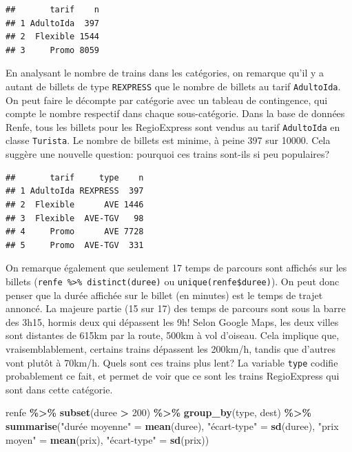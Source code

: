 \documentclass[
  11pt,
  letterpaper,
]{book}
\newenvironment{Shaded}{\begin{snugshade}}{\end{snugshade}}
\newcommand{\DecValTok}[1]{\textcolor[rgb]{0.00,0.00,0.81}{#1}}
\newcommand{\KeywordTok}[1]{\textcolor[rgb]{0.13,0.29,0.53}{\textbf{#1}}}
\newcommand{\NormalTok}[1]{#1}
\newcommand{\OperatorTok}[1]{\textcolor[rgb]{0.81,0.36,0.00}{\textbf{#1}}}
\newcommand{\StringTok}[1]{\textcolor[rgb]{0.31,0.60,0.02}{#1}}
\theoremstyle{definition}
\theoremstyle{definition}
\theoremstyle{definition}
\theoremstyle{remark}
\begin{document}
\begin{verbatim}
##       tarif    n
## 1 AdultoIda  397
## 2  Flexible 1544
## 3     Promo 8059
\end{verbatim}

En analysant le nombre de trains dans les catégories, on remarque qu'il y a autant de billets de type \texttt{REXPRESS} que le nombre de billets au tarif \texttt{AdultoIda}. On peut faire le décompte par catégorie avec un tableau de contingence, qui compte le nombre respectif dans chaque sous-catégorie. Dans la base de données Renfe, tous les billets pour les RegioExpress sont vendus au tarif \texttt{AdultoIda} en classe \texttt{Turista}. Le nombre de billets est minime, à peine 397 sur 10000. Cela suggère une nouvelle question: pourquoi ces trains sont-ils si peu populaires?

\begin{verbatim}
##       tarif     type    n
## 1 AdultoIda REXPRESS  397
## 2  Flexible      AVE 1446
## 3  Flexible  AVE-TGV   98
## 4     Promo      AVE 7728
## 5     Promo  AVE-TGV  331
\end{verbatim}

On remarque également que seulement 17 temps de parcours sont affichés sur les billets (\texttt{renfe\ \%\textgreater{}\%\ distinct(duree)} ou \texttt{unique(renfe\$duree)}). On peut donc penser que la durée affichée sur le billet (en minutes) est le temps de trajet annoncé. La majeure partie (15 sur 17) des temps de parcours sont sous la barre des 3h15, hormis deux qui dépassent les 9h! Selon Google Maps, les deux villes sont distantes de 615km par la route, 500km à vol d'oiseau. Cela implique que, vraisemblablement, certains trains dépassent les 200km/h, tandis que d'autres vont plutôt à 70km/h. Quels sont ces trains plus lent? La variable \texttt{type} codifie probablement ce fait, et permet de voir que ce sont les trains RegioExpress qui sont dans cette catégorie.

\begin{Shaded}
\begin{Highlighting}[]
\NormalTok{renfe }\OperatorTok{\%\textgreater{}\%}\StringTok{ }
\StringTok{  }\KeywordTok{subset}\NormalTok{(duree }\OperatorTok{\textgreater{}}\StringTok{ }\DecValTok{200}\NormalTok{) }\OperatorTok{\%\textgreater{}\%}\StringTok{ }
\StringTok{  }\KeywordTok{group\_by}\NormalTok{(type, dest) }\OperatorTok{\%\textgreater{}\%}\StringTok{ }
\StringTok{  }\KeywordTok{summarise}\NormalTok{(}\StringTok{"durée moyenne"}\NormalTok{ =}\StringTok{ }\KeywordTok{mean}\NormalTok{(duree), }
            \StringTok{"écart{-}type"}\NormalTok{ =}\StringTok{ }\KeywordTok{sd}\NormalTok{(duree),}
            \StringTok{"prix moyen"}\NormalTok{ =}\StringTok{ }\KeywordTok{mean}\NormalTok{(prix), }
            \StringTok{"écart{-}type"}\NormalTok{ =}\StringTok{ }\KeywordTok{sd}\NormalTok{(prix)) }
\end{Highlighting}
\end{Shaded}
\end{document}
